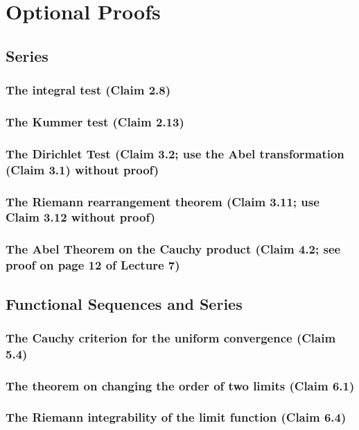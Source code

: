 \section{Optional Proofs}

\subsection{Series}
\subsubsection{The integral test (Claim 2.8)}
\subsubsection{The Kummer test (Claim 2.13)}
\subsubsection{The Dirichlet Test (Claim 3.2; use the Abel transformation (Claim 3.1) without proof)}
\subsubsection{The Riemann rearrangement theorem (Claim 3.11; use Claim 3.12 without proof)}
\subsubsection{The Abel Theorem on the Cauchy product (Claim 4.2; see proof on page 12 of Lecture 7)}

\clearpage

\subsection{Functional Sequences and Series}
\subsubsection{The Cauchy criterion for the uniform convergence (Claim 5.4)}
\subsubsection{The theorem on changing the order of two limits (Claim 6.1)}
\subsubsection{The Riemann integrability of the limit function (Claim 6.4)}
